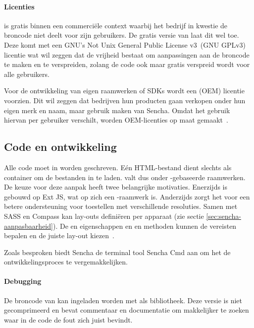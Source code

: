 \paragraph{Licenties}
\st{} is gratis binnen een commerciële context waarbij het bedrijf in kwestie de broncode niet deelt voor zijn gebruikers.  
De gratis  versie van \st{} laat dit wel toe.  
Deze komt met een GNU's Not Unix General Public License v3~(GNU GPLv3)  licentie wat wil zeggen dat de vrijheid bestaat om aanpassingen aan de broncode te maken en te verspreiden,  zolang de code ook maar gratis verspreid wordt voor alle gebruikers.
  
Voor de ontwikkeling van eigen raamwerken of SDKs wordt een  (OEM) licentie voorzien.  
Dit wil zeggen dat bedrijven hun producten gaan verkopen onder hun eigen merk en naam, maar gebruik maken van Sencha.  
Omdat het gebruik hiervan per gebruiker verschilt,  worden OEM-licenties op maat gemaakt~\cite{Inc.}.

\subsection{Code en ontwikkeling}
Alle code moet in \js{} worden geschreven.
Eén HTML-bestand dient slechts als container om de bestanden in te laden.  
\st{} valt dus onder \js{}-gebaseerde raamwerken.  
De keuze voor deze aanpak heeft twee belangrijke motivaties.  
Enerzijds is \st{} gebouwd op Ext JS,  wat op zich een \js{}-raamwerk is. 
Anderzijds zorgt het voor een betere ondersteuning voor toestellen met verschillende resoluties.  
Samen met SASS en Compass kan \st{} lay-outs definiëren per apparaat (zie sectie \ref{sec:sencha-aanpasbaarheid}).  
De  en  eigenschappen en  en  methoden kunnen de vereisten bepalen en de juiste lay-out kiezen~\cite{JohnEClark2012}.

Zoals besproken biedt Sencha de terminal tool Sencha Cmd aan om het de ontwikkelingsproces te vergemakkelijken.  

\paragraph{Debugging}
De broncode van \st{} kan ingeladen worden met  als bibliotheek.  
Deze versie is niet gecomprimeerd en bevat commentaar en documentatie om makkelijker te zoeken waar in de code de fout zich juist bevindt.

